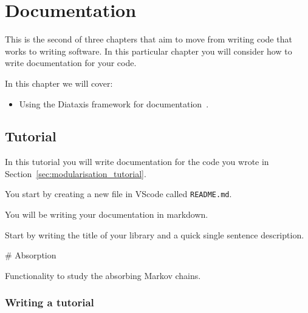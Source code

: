\chapter{Documentation}
\label{\detokenize{building-tools/06-documentation/introduction/main:documentation}}\label{\detokenize{building-tools/06-documentation/introduction/main::doc}}

This is the second of three chapters that aim to move from writing code
that works to writing software. In this particular chapter you will consider how
to write documentation for your code.

\begin{note}
In this chapter we will cover:
\begin{itemize}
\item 

Using the Diataxis framework for
documentation~\cite{Procida_Diataxis_documentation_framework}.

\end{itemize}
\end{note}




\section{Tutorial}
\label{\detokenize{building-tools/06-documentation/tutorial/main:tutorial}}\label{\detokenize{building-tools/06-documentation/tutorial/main:documentation}}\label{\detokenize{building-tools/06-documentation/tutorial/main::doc}}

In this tutorial you will write documentation for the code
you wrote in Section~\ref{sec:modularisation_tutorial}.


You start by creating a new file in VScode called \texttt{README.md}.

\begin{note}
You will be writing your documentation in markdown.
\end{note}


Start by writing the title of your library and a quick single sentence
description.

\begin{md}
# Absorption

Functionality to study the absorbing Markov chains.
\end{md}


\subsection{Writing a tutorial}
\label{\detokenize{building-tools/06-documentation/tutorial/main:writing-a-tutorial}}


